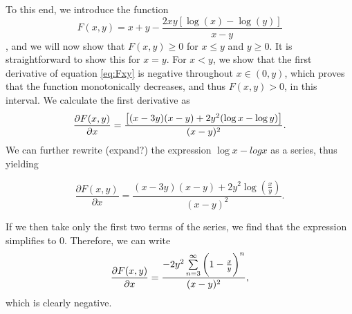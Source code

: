 \documentclass{pnastwo}
\begin{document}
\begin{article}
To this end, we introduce the function 
\begin{equation}\label{eq:Fxy}
F(x,y) = x + y - \frac{2xy[\log(x) - \log(y)]}{x - y}
\end{equation}, 
and we will now show that $F(x,y) \geq 0$ for $x \leq y$ and $y \geq 0 $. It is straightforward to show this for $x=y$. For $x < y$, we show that the first derivative of equation \eqref{eq:Fxy} is negative throughout $x \in (0,y)$, which proves that the function monotonically decreases, and thus $F(x,y) > 0$, in this interval. We calculate the first derivative as 
\begin{equation}
\frac{\partial{F(x,y)}}{\partial{x}} = \frac{\big{[} (x-3y)(x-y)+ 2y^2(\log{x} - \log{y}) \big{]}}{(x-y)^2} .
\end{equation}
We can further rewrite (expand?) the expression $\log{x} - log{x}$ as a series, thus yielding

\begin{equation}
\frac{\partial{F(x,y)}}{\partial{x}} = \frac{(x-3y)(x-y) + 2y^2\log(\frac{x}{y})} {(x-y)^2} .
\end{equation}

If we then take only the first two terms of the series, we find that the expression simplifies to 0. Therefore, we can write
\begin{equation}
\frac{\partial{F(x,y)}}{\partial{x}} = \frac{-2y^2\sum\limits_{n=3}^\infty \bigg{(}1-\frac{x}{y}\bigg{)}^n}{(x-y)^2} ,
\end{equation}
which is clearly negative. 



\end{article}
\end{document}
